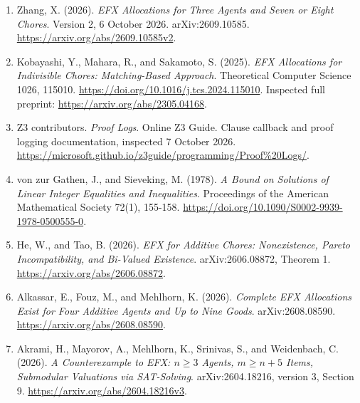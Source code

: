 \documentclass[
  11pt,
]{article}
\begin{document}
\begin{enumerate}
\def\labelenumi{\arabic{enumi}.}
\item
  Zhang, X. (2026). \emph{EFX Allocations for Three Agents and Seven or
  Eight Chores}. Version 2, 6 October 2026. arXiv:2609.10585.
  \url{https://arxiv.org/abs/2609.10585v2}.
\item
  Kobayashi, Y., Mahara, R., and Sakamoto, S. (2025). \emph{EFX
  Allocations for Indivisible Chores: Matching-Based Approach}.
  Theoretical Computer Science 1026, 115010.
  \url{https://doi.org/10.1016/j.tcs.2024.115010}. Inspected full
  preprint: \url{https://arxiv.org/abs/2305.04168}.
\item
  Z3 contributors. \emph{Proof Logs}. Online Z3 Guide. Clause callback
  and proof logging documentation, inspected 7 October 2026.
  \url{https://microsoft.github.io/z3guide/programming/Proof\%20Logs/}.
\item
  von zur Gathen, J., and Sieveking, M. (1978). \emph{A Bound on
  Solutions of Linear Integer Equalities and Inequalities}. Proceedings
  of the American Mathematical Society 72(1), 155-158.
  \url{https://doi.org/10.1090/S0002-9939-1978-0500555-0}.
\item
  He, W., and Tao, B. (2026). \emph{EFX for Additive Chores:
  Nonexistence, Pareto Incompatibility, and Bi-Valued Existence}.
  arXiv:2606.08872, Theorem 1. \url{https://arxiv.org/abs/2606.08872}.
\item
  Alkassar, E., Fouz, M., and Mehlhorn, K. (2026). \emph{Complete EFX
  Allocations Exist for Four Additive Agents and Up to Nine Goods}.
  arXiv:2608.08590. \url{https://arxiv.org/abs/2608.08590}.
\item
  Akrami, H., Mayorov, A., Mehlhorn, K., Srinivas, S., and Weidenbach,
  C. (2026). \emph{A Counterexample to EFX: \(n\ge3\) Agents,
  \(m\ge n+5\) Items, Submodular Valuations via SAT-Solving}.
  arXiv:2604.18216, version 3, Section 9.
  \url{https://arxiv.org/abs/2604.18216v3}.
\end{enumerate}
\end{document}
